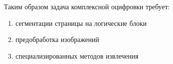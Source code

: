 Таким образом задача комплексной оцифровки требует:
\begin{enumerate}
	\item сегментации страницы на логические блоки
	\item предобработка изображений 
	\item специализированных методов извлечения
\end{enumerate}